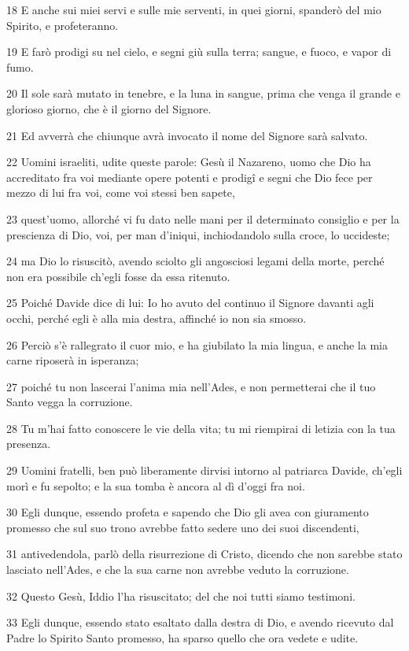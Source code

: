 \par 18 E anche sui miei servi e sulle mie serventi, in quei giorni, spanderò del mio Spirito, e profeteranno.
\par 19 E farò prodigi su nel cielo, e segni giù sulla terra; sangue, e fuoco, e vapor di fumo.
\par 20 Il sole sarà mutato in tenebre, e la luna in sangue, prima che venga il grande e glorioso giorno, che è il giorno del Signore.
\par 21 Ed avverrà che chiunque avrà invocato il nome del Signore sarà salvato.
\par 22 Uomini israeliti, udite queste parole: Gesù il Nazareno, uomo che Dio ha accreditato fra voi mediante opere potenti e prodigî e segni che Dio fece per mezzo di lui fra voi, come voi stessi ben sapete,
\par 23 quest'uomo, allorché vi fu dato nelle mani per il determinato consiglio e per la prescienza di Dio, voi, per man d'iniqui, inchiodandolo sulla croce, lo uccideste;
\par 24 ma Dio lo risuscitò, avendo sciolto gli angosciosi legami della morte, perché non era possibile ch'egli fosse da essa ritenuto.
\par 25 Poiché Davide dice di lui: Io ho avuto del continuo il Signore davanti agli occhi, perché egli è alla mia destra, affinché io non sia smosso.
\par 26 Perciò s'è rallegrato il cuor mio, e ha giubilato la mia lingua, e anche la mia carne riposerà in isperanza;
\par 27 poiché tu non lascerai l'anima mia nell'Ades, e non permetterai che il tuo Santo vegga la corruzione.
\par 28 Tu m'hai fatto conoscere le vie della vita; tu mi riempirai di letizia con la tua presenza.
\par 29 Uomini fratelli, ben può liberamente dirvisi intorno al patriarca Davide, ch'egli morì e fu sepolto; e la sua tomba è ancora al dì d'oggi fra noi.
\par 30 Egli dunque, essendo profeta e sapendo che Dio gli avea con giuramento promesso che sul suo trono avrebbe fatto sedere uno dei suoi discendenti,
\par 31 antivedendola, parlò della risurrezione di Cristo, dicendo che non sarebbe stato lasciato nell'Ades, e che la sua carne non avrebbe veduto la corruzione.
\par 32 Questo Gesù, Iddio l'ha risuscitato; del che noi tutti siamo testimoni.
\par 33 Egli dunque, essendo stato esaltato dalla destra di Dio, e avendo ricevuto dal Padre lo Spirito Santo promesso, ha sparso quello che ora vedete e udite.
